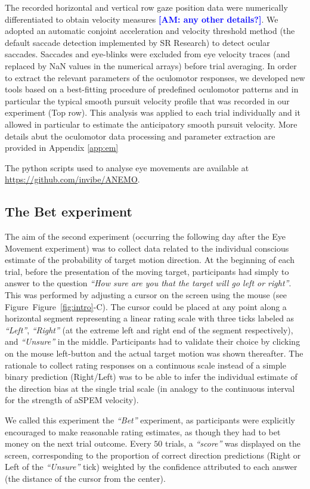 \documentclass[12pt,english]{article}%
\newcommand{\seeFig}[1]{Figure~\ref{fig:#1}}
\newcommand{\AM}[1]{\textbf{\textcolor{blue}{[AM: #1]}}}
\begin{document}
The recorded horizontal and vertical row gaze position data were numerically differentiated to obtain velocity measures \AM{any other details?}. We adopted an automatic conjoint acceleration and velocity threshold method (the default saccade detection implemented by SR Research) to detect ocular saccades. Saccades and eye-blinks were excluded from eye velocity traces (and replaced by NaN values in the numerical arrays) before trial averaging. 
In order to extract the relevant parameters of the oculomotor responses, we developed new tools based on a best-fitting procedure of predefined oculomotor patterns and in particular the typical smooth pursuit velocity profile that was recorded in our experiment (Top row). This analysis was applied to each trial individually and it allowed in particular to estimate the anticipatory smooth pursuit velocity. More details abut the oculomotor data processing and parameter extraction are provided in Appendix \ref{app:em} 

The python scripts used to analyse eye movements are available at \url{https://github.com/invibe/ANEMO}.

\subsection{The Bet experiment}
The aim of the second experiment (occurring the following day after the Eye Movement experiment) was to collect data related to the individual conscious estimate of the probability of target motion direction. At the beginning of each trial, before the presentation of the moving target, participants had simply to answer to the question \textit{ ``How sure are you that the target will go left or right''}. This was performed by adjusting a cursor on the screen using the mouse (see Figure~\seeFig{intro}-C). The cursor could be placed at any point along a horizontal segment representing a linear rating scale with three ticks labeled as \textit{ ``Left''}, \textit{``Right''} (at the extreme left and right end of the segment respectively), and \textit{``Unsure''} in the middle. Participants had to validate their choice by clicking on the mouse left-button and the actual target motion was shown thereafter. The rationale to collect rating responses on a continuous scale instead of a simple binary prediction (Right/Left) was to be able to infer the individual estimate of the direction bias at the single trial scale (in analogy to the continuous interval for the strength of aSPEM velocity).

We called this experiment the \textit{ ``Bet''} experiment, as participants were explicitly encouraged to make reasonable rating estimates, as though they had to bet money on the next trial outcome. Every $50$ trials, a \textit{``score''} was displayed on the screen, corresponding to the proportion of correct direction predictions (Right or Left of the \textit{``Unsure''} tick) weighted by the confidence attributed to each answer (the distance of the cursor from the center).
\end{document}
